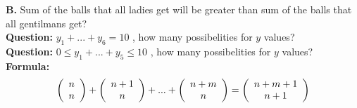 \documentclass[11pt]{article}
\begin{document}
\textbf{B.} Sum of the balls that all ladies get will be greater than sum of the balls that all gentilmans get?
\\

\textbf{Question: } $y_1 + ... + y_6 = 10$ , how many possibelities for $y$ values?
\\ %

\textbf{Question: } $0 \leq y_1 + ... + y_5 \leq 10$ , how many possibelities for $y$ values?
\\ %

\textbf{Formula: } $$\left( {\begin{array}{*{20}c} n \\ n \\ \end{array}} \right) +  \left( 
{\begin{array}{*{20}c} n+1 \\ n \\ \end{array}} \right) + ... +  \left( {\begin{array}{*{20}c} n+m 
\\ n \\ \end{array}} \right) =  \left( {\begin{array}{*{20}c} n+m+1 \\ n+1 \\ \end{array}} 
\right)$$
\end{document}
